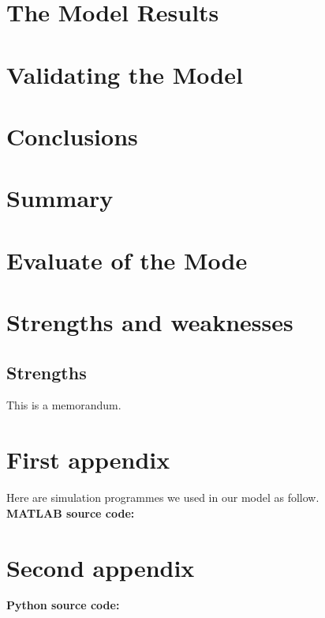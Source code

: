 \documentclass{main}  %
\begin{document}
\section{The Model Results}  %

\section{Validating the Model}  %

\section{Conclusions}  %

\section{Summary}  %

\section{Evaluate of the Mode}  %

\section{Strengths and weaknesses}  %

\subsection{Strengths}  %

\newpage
\printbibliography  %


\newpage
\begin{appendices}  %

\begin{memo}[Memorandum]  %
	This is a memorandum.
\end{memo}  %

\section{First appendix}  %

Here are simulation programmes we used in our model as follow.\\
\textbf{MATLAB source code:}


\section{Second appendix}  %

\textbf{Python source code:}


\end{appendices}  %
\end{document}
